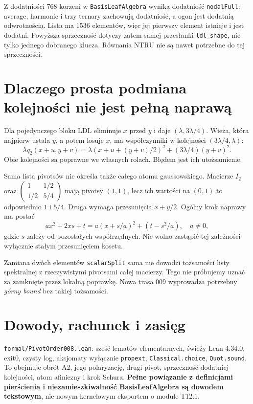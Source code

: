 \documentclass[11pt,a4paper]{article}
\newcommand{\code}[1]{\nolinkurl{#1}}
\begin{document}
Z dodatniości 768 korzeni w \code{BasisLeafAlgebra} wynika dodatniość
\code{nodalFull}: average, harmonic i trzy ternary zachowują dodatniość,
a ogon jest dodatnią odwrotnością. Lista ma 1536 elementów, więc jej
pierwszy element istnieje i jest dodatni. Powyższa sprzeczność dotyczy
zatem samej przesłanki \code{ldl_shape}, nie tylko jednego dobranego klucza.
Równania NTRU nie są nawet potrzebne do tej sprzeczności.

\section{Dlaczego prosta podmiana kolejności nie jest pełną naprawą}
Dla pojedynczego bloku LDL eliminuje $x$ przed $y$ i daje
$(\lambda,3\lambda/4)$. Wieża, która najpierw ustala $y$, a potem losuje
$x$, ma współczynniki w kolejności $(3\lambda/4,\lambda)$:
\[
 \lambda q_2(x+u,y+v)=\lambda(x+u+(y+v)/2)^2
                         +(3\lambda/4)(y+v)^2.
\]
Obie kolejności są poprawne we własnych rolach. Błędem jest ich utożsamienie.

Sama lista pivotsów nie określa także całego atomu gaussowskiego.
Macierze $I_2$ oraz
$\begin{pmatrix}1&1/2\\1/2&5/4\end{pmatrix}$ mają pivotsy
$(1,1)$, lecz ich wartości na $(0,1)$ to odpowiednio $1$ i $5/4$.
Druga wymaga przesunięcia $x+y/2$. Ogólny krok naprawy ma postać
\[
 ax^2+2xs+t=a(x+s/a)^2+(t-s^2/a),\quad a\ne0,
\]
gdzie $s$ zależy od pozostałych współrzędnych. Nie wolno zastąpić tej
zależności wyłącznie stałym przesunięciem kosetu.

Zamiana dwóch elementów \code{scalarSplit} sama nie dowodzi tożsamości
listy spektralnej z rzeczywistymi pivotsami całej macierzy. Tego nie
próbujemy uznać za zamknięte przez lokalną poprawkę. Nowa trasa 009
wyprowadza potrzebny \emph{górny bound} bez takiej tożsamości.

\section{Dowody, rachunek i zasięg}
\code{formal/PivotOrder008.lean}: sześć lematów elementarnych, świeży
Lean 4.34.0, exit0, czysty log, aksjomaty wyłącznie
\code{propext}, \code{Classical.choice}, \code{Quot.sound}.
To obejmuje obrót A2, jego polaryzację, drugi pivot, sprzeczność dodatniej
kolejności, atom afiniczny i krok Schura. \textbf{Pełne powiązanie z definicjami
pierścienia i niezamieszkiwalność BasisLeafAlgebra są dowodem tekstowym},
nie nowym kernelowym eksportem o module T12.1.
\end{document}
